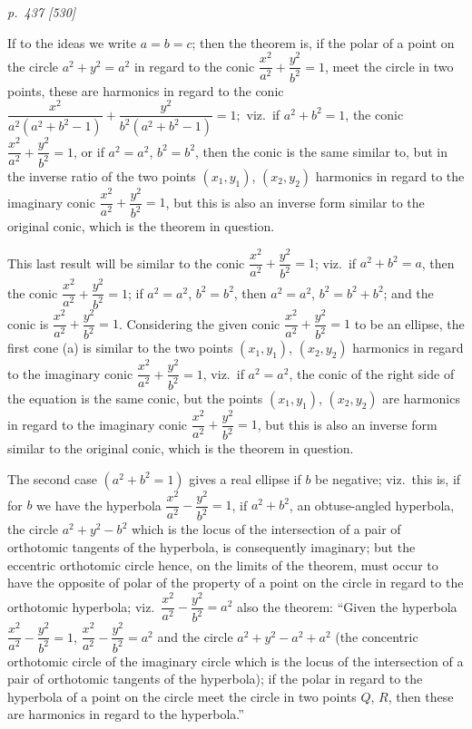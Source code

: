 \documentclass[11pt,a4paper]{article}
\theoremstyle{plain}
\theoremstyle{definition}
\begin{document}
\clearpage

\bigskip
\textit{p.~437 [530]}
\smallskip

\noindent
If to the ideas we write $a = b = c$; then the theorem is, if the polar of a
point on the circle $a^2 + y^2 = a^2$ in regard to the conic $\dfrac{x^2}{a^2} + \dfrac{y^2}{b^2} = 1$, meet the circle
in two points, these are harmonics in regard to the conic $\dfrac{x^2}{a^2(a^2 + b^2 - 1)} + \dfrac{y^2}{b^2(a^2 + b^2 - 1)} = 1;$ viz.\
if $a^2 + b^2 = 1$, the conic $\dfrac{x^2}{a^2} + \dfrac{y^2}{b^2} = 1$, or if $a^2 = a^2$, $b^2 = b^2$, then the conic is the
same similar to, but in the inverse ratio of the two points $(x_1, y_1)$, $(x_2, y_2)$
harmonics in regard to the imaginary conic $\dfrac{x^2}{a^2} + \dfrac{y^2}{b^2} = 1$, but this is also an inverse
form similar to the original conic, which is the theorem in question.

This last result will be similar to the conic $\dfrac{x^2}{a^2} + \dfrac{y^2}{b^2} = 1$; viz.\ if
$a^2 + b^2 = a$, then the conic $\dfrac{x^2}{a^2} + \dfrac{y^2}{b^2} = 1$; if $a^2 = a^2$, $b^2 = b^2$, then $a^2 = a^2$,
$b^2 = b^2 + b^2$; and the conic is $\dfrac{x^2}{a^2} + \dfrac{y^2}{b^2} = 1$. Considering the given conic $\dfrac{x^2}{a^2} + \dfrac{y^2}{b^2} = 1$
to be an ellipse, the first cone (a) is similar to the two points $(x_1, y_1)$, $(x_2, y_2)$
harmonics in regard to the imaginary conic $\dfrac{x^2}{a^2} + \dfrac{y^2}{b^2} = 1$, viz.\ if $a^2 = a^2$, the conic
of the right side of the equation is the same conic, but the points $(x_1, y_1)$, $(x_2, y_2)$
are harmonics in regard to the imaginary conic $\dfrac{x^2}{a^2} + \dfrac{y^2}{b^2} = 1$, but this is also an inverse
form similar to the original conic, which is the theorem in question.

The second case $(a^2 + b^2 = 1)$ gives a real ellipse if $b$ be negative; viz.\ this
is, if for $b$ we have the hyperbola $\dfrac{x^2}{a^2} - \dfrac{y^2}{b^2} = 1$, if $a^2 + b^2$, an obtuse-angled hyperbola,
the circle $a^2 + y^2 - b^2$ which is the locus of the intersection of a pair of orthotomic
tangents of the hyperbola, is consequently imaginary; but the eccentric orthotomic
circle hence, on the limits of the theorem, must occur to have the opposite of polar
of the property of a point on the circle in regard to the orthotomic hyperbola; viz.\ $\dfrac{x^2}{a^2} - \dfrac{y^2}{b^2} = a^2$ also
the theorem: ``Given the hyperbola $\dfrac{x^2}{a^2} - \dfrac{y^2}{b^2} = 1$, $\dfrac{x^2}{a^2} - \dfrac{y^2}{b^2} = a^2$ and the circle $a^2 + y^2 - a^2 + a^2$
(the concentric orthotomic circle of the imaginary circle which is the locus of the
intersection of a pair of orthotomic tangents of the hyperbola); if the polar in regard
to the hyperbola of a point on the circle meet the circle in two points $Q$, $R$, then
these are harmonics in regard to the hyperbola.''
\end{document}
